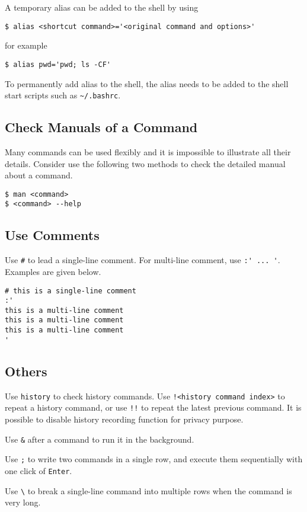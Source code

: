 {A temporary alias can be added to the shell by using
\begin{lstlisting}
$ alias <shortcut command>='<original command and options>'
\end{lstlisting}
for example
\begin{lstlisting}
$ alias pwd='pwd; ls -CF'
\end{lstlisting}

To permanently add alias to the shell, the alias needs to be added to the shell start scripts such as \verb|~/.bashrc|.

\subsection{Check Manuals of a Command}

Many commands can be used flexibly and it is impossible to illustrate all their details. Consider use the following two methods to check the detailed manual about a command.
\begin{lstlisting}
$ man <command>
$ <command> --help
\end{lstlisting}

\subsection{Use Comments}

Use \verb|#| to lead a single-line comment. For multi-line comment, use \verb|:' ... '|. Examples are given below.
\begin{lstlisting}
# this is a single-line comment
:'
this is a multi-line comment
this is a multi-line comment
this is a multi-line comment
'
\end{lstlisting}

\subsection{Others}

Use \verb|history| to check history commands. Use \verb|!<history command index>| to repeat a history command, or use \verb|!!| to repeat the latest previous command. It is possible to disable history recording function for privacy purpose.

Use \verb|&| after a command to run it in the background.

Use \verb|;| to write two commands in a single row, and execute them sequentially with one click of \verb|Enter|.

Use \verb|\| to break a single-line command into multiple rows when the command is very long.

}
